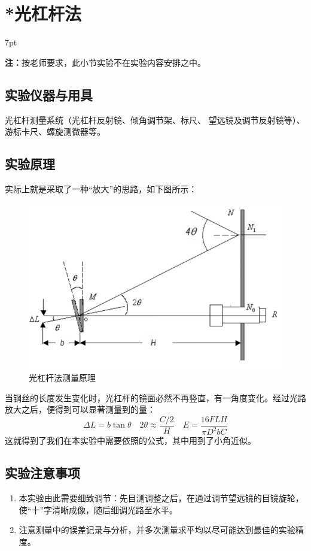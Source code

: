 \documentclass[UTF8]{article}
\theoremstyle{MyLineTheoremStyle} %
\theoremstyle{MyBlockTheoremStyle} %
\theoremstyle{MySubsubsectionStyle} %
\newenvironment{graybox}{%
        \def\FrameCommand{%
        \hspace{1pt}%
        {\color{gray}\vrule width 2pt}%
        {\color{graybox_color}\vrule width 4pt}%
        \colorbox{graybox_color}%
        }%
        \MakeFramed{\advance\hsize-\width\FrameRestore}%
        \noindent\hspace{-4.55pt}%
        \begin{adjustwidth}{}{7pt}%
        \vspace{2pt}\vspace{2pt}%
        }
        {%
        \vspace{2pt}\end{adjustwidth}\endMakeFramed%
        }
\begin{document}
\section{*光杠杆法}\vspace*{-6mm}
\begin{graybox}
\textbf{注：}按老师要求，此小节实验不在实验内容安排之中。
\end{graybox}

\subsection{实验仪器与用具}
光杠杆测量系统（光杠杆反射镜、倾角调节架、标尺、
望远镜及调节反射镜等）、游标卡尺、螺旋测微器等。

\subsection{实验原理}

实际上就是采取了一种“放大”的思路，如下图所示：
\begin{figure}[H]\centering
    \includegraphics[width=0.6\columnwidth]{assets/0/image (19) copy.png}
    \caption{光杠杆法测量原理}
\end{figure}
当钢丝的长度发生变化时，光杠杆的镜面必然不再竖直，有一角度变化。经过光路放大之后，便得到可以显著测量到的量：
\begin{equation}
    \Delta L=b\tan \theta\quad 2\theta \approx \frac{C/2}{H}
    \quad E=\frac{16FLH}{\pi D^2bC}
\end{equation}
这就得到了我们在本实验中需要依照的公式，其中用到了小角近似。

\subsection{实验注意事项}
\begin{enumerate}
\item 本实验由此需要细致调节：先目测调整之后，在通过调节望远镜的目镜旋轮，使“十”字清晰成像，随后细调光路至水平。
\item 注意测量中的误差记录与分析，并多次测量求平均以尽可能达到最佳的实验精度。

\end{enumerate}
\end{document}
